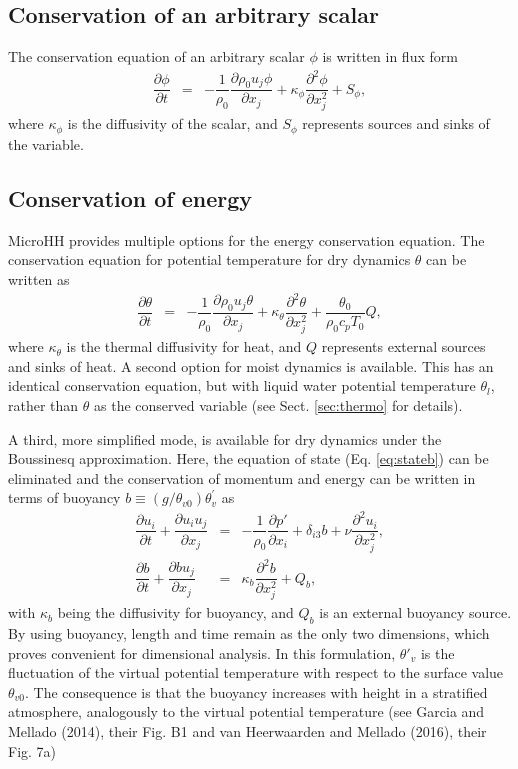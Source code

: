 \documentclass[gmd,manuscript]{copernicus}
\begin{document}
\subsection{Conservation of an arbitrary scalar}
The conservation equation of an arbitrary scalar $\phi$ is written in flux form
\begin{eqnarray}
\dfrac{\partial \phi}{\partial t} & = & - \dfrac{1}{\rho_0} \dfrac{\partial \rho_0 u_j \phi}{\partial x_j} +
\kappa_\phi \dfrac{\partial^2 \phi}{\partial x_j^2} + S_\phi, \label{eq:consscal}
\end{eqnarray}
where $\kappa_\phi$ is the diffusivity of the scalar, and $S_\phi$ represents sources and sinks of the variable.

\subsection{Conservation of energy}\label{sec:dyncore_energy}
\label{sec:conservation_of_energy}
MicroHH provides multiple options for the energy conservation equation. The conservation equation for  potential temperature for dry dynamics $\theta$ can be written as
\begin{eqnarray}
\dfrac{\partial \theta}{\partial t} & = & - \dfrac{1}{\rho_0} \dfrac{\partial \rho_0 u_j \theta}{\partial x_j} + \kappa_\theta \dfrac{\partial^2 \theta}{\partial x_j^2} + \dfrac{\theta_0}{\rho_0 c_p T_0} Q,\label{eq:consthermo}
\end{eqnarray}
where $\kappa_\theta$ is the thermal diffusivity for heat, and $Q$ represents external sources and sinks of heat. A second option for moist dynamics is available. This has an identical conservation equation, but with liquid water potential temperature $\theta_l$, rather than $\theta$ as the conserved variable (see Sect. \ref{sec:thermo} for details). 

A third, more simplified mode, is available for dry dynamics under the Boussinesq approximation. Here, the equation of state (Eq. \ref{eq:stateb}) can be eliminated and the conservation of momentum and energy can be written in terms of buoyancy $b \equiv \left( g/\theta_{v0} \right) \theta_v^\prime$ as
\begin{eqnarray}
\dfrac{\partial u_i}{\partial t} + \dfrac{\partial u_i u_j}{\partial x_j} & = & 
- \dfrac{1}{\rho_0}\dfrac{\partial p'}{\partial x_i} + \delta_{i3} b + \nu \dfrac{\partial^2 u_i}{\partial x_j^2}\label{eq:consmombsimp},\\
\dfrac{\partial b}{\partial t} + \dfrac{\partial b u_j}{\partial x_j} & = & 
\kappa_b \dfrac{\partial^2 b}{\partial x_j^2} + Q_b \label{eq:consbsimp},
\end{eqnarray}
with $\kappa_b$ being the diffusivity for buoyancy, and $Q_b$ is an external buoyancy source. By using buoyancy, length and time remain as the only two dimensions, which proves convenient for dimensional analysis. In this formulation, $\theta'_v$ is the fluctuation of the virtual potential temperature with respect to the surface value $\theta_{v0}$. The consequence is that the buoyancy increases with height in a stratified atmosphere, analogously to the virtual potential temperature (see Garcia and Mellado (2014), their Fig. B1 and van Heerwaarden and Mellado (2016), their Fig. 7a)
\end{document}
